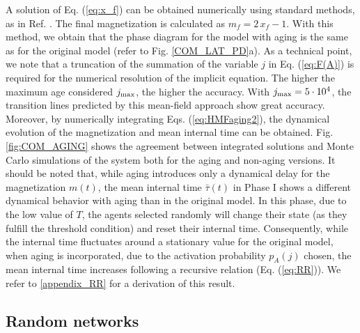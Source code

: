 	A solution of Eq. (\ref{eq:x_f}) can be obtained numerically using standard methods, as in Ref. \cite{chen-2020}. The final magnetization is calculated as $m_f = 2 \,x_f - 1$. With this method, we obtain that the phase diagram for the model with aging is the same as for the original model (refer to Fig. \ref{COM_LAT_PD}a). As a technical point, we note that a truncation of the summation of the variable $j$ in Eq. (\ref{eq:F(A)}) is required for the numerical resolution of the implicit equation. The higher the maximum age considered $j_{\rm max}$, the higher the accuracy. With $j_{\rm max} = 5 \cdot 10^4$, the transition lines predicted by this mean-field approach show great accuracy. Moreover, by numerically integrating Eqs. (\ref{eq:HMFaging2}), the dynamical evolution of the magnetization and mean internal time can be obtained. Fig. \ref{fig:COM_AGING} shows the agreement between integrated solutions and Monte Carlo simulations of the system both for the aging and non-aging versions. It should be noted that, while aging introduces only a dynamical delay for the magnetization $m(t)$, the mean internal time $\bar{\tau}(t)$ in Phase I shows a different dynamical behavior with aging than in the original model. In this phase, due to the low value of $T$, the agents selected randomly will change their state (as they fulfill the threshold condition) and reset their internal time. Consequently, while the internal time fluctuates around a stationary value for the original model, when aging is incorporated, due to the activation probability $p_A(j)$ chosen, the mean internal time increases following a recursive relation (Eq. (\ref{eq:RR})). We refer to \ref{appendix_RR} for a derivation of this result.
	
	\subsection{\label{sec:Complex networks aging} Random networks}
	
